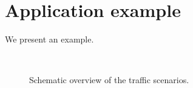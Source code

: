 \section{Application example}
\label{sec:example}

\color{red}

We present an example.

\begin{figure}
	\centering
	\setlength\figureheight{100pt}
	\setlength\figurewidth{260pt}
	\\
	\caption{Schematic overview of the traffic scenarios.}
\end{figure}

\color{black}

